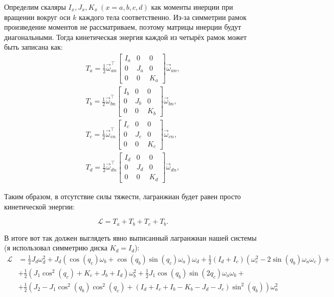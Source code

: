 \documentclass{article}
\begin{document}
Определим скаляры $I_x,J_x,K_x~(x=a,b,c,d)$ как моменты инерции при вращении вокруг оси $k$ каждого тела соответственно.
Из-за симметрии рамок произведение моментов не рассматриваем, поэтому матрицы инерции будут диагональными.
Тогда кинетическая энергия каждой из четырёх рамок может быть записана как:
\begin{align*}
T_a = \frac{1}{2}\vec\omega_{an}^\top \begin{bmatrix}I_a&0&0\\0&J_a&0\\0&0&K_a\end{bmatrix}\vec\omega_{an},\\
T_b = \frac{1}{2}\vec\omega_{bn}^\top \begin{bmatrix}I_b&0&0\\0&J_b&0\\0&0&K_b\end{bmatrix}\vec\omega_{bn},\\
T_c = \frac{1}{2}\vec\omega_{cn}^\top \begin{bmatrix}I_c&0&0\\0&J_c&0\\0&0&K_c\end{bmatrix}\vec\omega_{cn},\\
T_d = \frac{1}{2}\vec\omega_{dn}^\top \begin{bmatrix}I_d&0&0\\0&J_d&0\\0&0&K_d\end{bmatrix}\vec\omega_{dn}, 
\end{align*}

Таким образом, в отсутствие силы тяжести, лагранжиан будет равен просто кинетической энергии:

$$
\mathcal L = T_a + T_b + T_c + T_b.
$$

В итоге вот так должен выглядеть явно выписанный лагранжиан нашей системы (я использовал симметрию диска $K_d=I_d$):
\begin{align*}
\mathcal L & = \frac{1}{2} J_d \omega_d^2 + J_d\left(\cos(q_c)\omega_b+\cos(q_b)\sin(q_c)\omega_a\right)\omega_d+
  \frac{1}{2}\left(I_d+I_c\right)\left(\omega_c^2-2\sin(q_b)\omega_a\omega_c\right)+\\
  & + \frac{1}{2}\left(J_1\cos^2(q_c)+K_c +J_b+I_d\right)\omega_b^2+ \frac{1}{2}J_1\cos(q_b)\sin(2 q_c)\omega_a\omega_b+\\
  & + \frac{1}{2}\left(J_2-J_1\cos^2(q_b)\cos^2(q_c)+\left(I_d+ I_c+I_b-K_b-J_d- J_c\right)\sin^2(q_b)\right)\omega_a^2
\end{align*}
\end{document}
